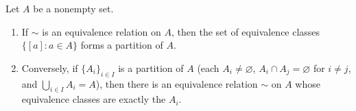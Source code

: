 \documentclass[12pt]{article}
\theoremstyle{definition}
\begin{document}
\noindent
Let \(A\) be a nonempty set.

\vspace{1em}

\begin{enumerate}
    \item If \(\sim\) is an equivalence relation on \(A\), then the set of equivalence classes
          \(\{[a] : a\in A\}\) forms a partition of \(A\).
    \item Conversely, if \(\{A_i\}_{i\in I}\) is a partition of \(A\) (each \(A_i\neq\varnothing\), \(A_i\cap A_j=\varnothing\) for \(i\neq j\), and \(\bigcup_{i\in I}A_i=A\)), then there is an equivalence relation \(\sim\) on \(A\) whose equivalence classes are exactly the \(A_i\).
\end{enumerate}

\newpage
\end{document}
